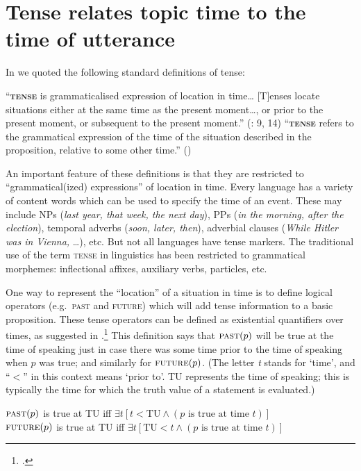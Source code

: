 \section{Tense relates topic time to the time of utterance}\label{sec:21.2}

In  we quoted the following standard definitions of tense:


\ea \label{ex:21.2}
\ea   “\textbf{\textsc{tense}} is grammaticalised expression of location in time… [T]enses locate situations either at the same time as the present moment…, or prior to the present moment, or subsequent to the present moment.” (\citealt{Comrie1985}: 9, 14)
\ex   “\textbf{\textsc{tense}} refers to the grammatical expression of the time of the situation described in the proposition, relative to some other time.” (\citealt[144]{Bybee1992})
\z \z


An important feature of these definitions is that they are restricted to “grammatical(ized) expressions” of location in time. Every language has a variety of content words which can be used to specify the time of an event. These may include NPs (\textit{last year, that week, the next day}), PPs (\textit{in the morning, after the election}), temporal adverbs (\textit{soon, later, then}), adverbial clauses (\textit{While Hitler was in Vienna,} …), etc. But not all languages have tense markers. The traditional use of the term \textsc{tense} in linguistics has been restricted to grammatical morphemes: inflectional affixes, auxiliary verbs, particles, etc.



One way to represent the “location” of a situation in time is to define logical operators (e.g.~\textsc{past} and \textsc{future}) which will add tense information to a basic proposition. These tense operators can be defined as existential quantifiers over times, as suggested in .\footnote{\citet{Prior1957,Prior1967}.} This definition says that $\textsc{past}(p)$ will be true at the time of speaking just in case there was some time prior to the time of speaking when $p$ was true; and similarly for $\textsc{future}(p)$. (The letter \textit{t} stands for ‘time’, and “{$<$}” in this context means ‘prior to’. TU represents the time of speaking; this is typically the time for which the truth value of a statement is evaluated.)


\ea \label{ex:21.3}
$\textsc{past}(p)$ is true at TU  iff  $\exists t [t < \text{TU} \wedge (p \text{ is true at time } t)]$\\
$\textsc{future}(p)$ is true at TU  iff  $\exists t [\text{TU} < t \wedge (p \text{ is true at time } t)]$
\z


